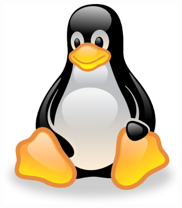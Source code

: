 \begin{figure}[htb] %
    \centering
    \begin{subfigure}[b]{0.3\textwidth} %
        \includegraphics[width=\textwidth]{figures/penguins/tux1.png} %
        \caption{} %
        \label{fig:tux1}
    \end{subfigure}
    \begin{subfigure}[b]{0.3\textwidth} %

\end{subfigure}
\end{figure}
